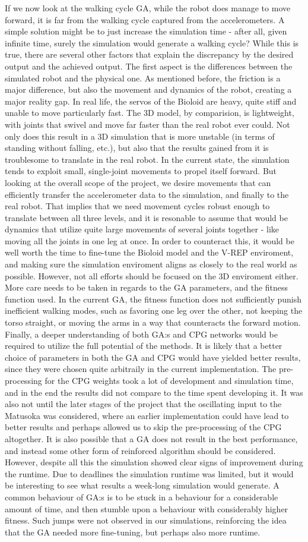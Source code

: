 If we now look at the walking cycle GA, while the robot does manage to move forward, it is far from the walking cycle captured from the accelerometers. A simple solution might be to just increase the simulation time - after all, given infinite time, surely the simulation would generate a walking cycle? While this is true, there are several other factors that explain the discrepancy by the desired output and the achieved output. The first aspect is the differences between the simulated robot and the physical one. As mentioned before, the friction is a major difference, but also the movement and dynamics of the robot, creating a major reality gap. In real life, the servos of the Bioloid are heavy, quite stiff and unable to move particularly fast. The 3D model, by comparision, is lightweight, with joints that swivel and move far faster than the real robot ever could. Not only does this result in a 3D simulation that is more unstable  (in terms of standing without falling, etc.), but also that the results gained from it is troublesome to translate in the real robot. In the current state, the simulation tends to exploit small, single-joint movements to propel itself forward. But looking at the overall scope of the project, we desire movements that can efficiently transfer the accelerometer data to the simulation, and finally to the real robot. That implies that we need movement cycles robust enough to translate between all three levels, and it is resonable to assume that would be dynamics that utilize quite large movements of several joints together - like moving all the joints in one leg at once. In order to counteract this, it would be well worth the time to fine-tune the Bioloid model and the V-REP enviroment, and making sure the simulation enviroment aligns as closely to the real world as possible. However, not all efforts should be focused on the 3D enviroment either. More care needs to be taken in regards to the GA parameters, and the fitness function used. In the current GA, the fitness function does not sufficiently punish inefficient walking modes, such as favoring one leg over the other, not keeping the torso straight, or moving the arms in a way that counteracts the forward motion. Finally, a deeper  understanding of both GA:s and CPG networks would be required to utilize the full potential of the methods. It is likely that a better choice of parameters in both the GA and CPG would have yielded better results, since they were chosen quite arbitraily in the current implementation. The pre-processing for the CPG weights took a lot of development and simulation time, and in the end the results did not compare to the time spent developing it. It was also not until the later stages of the project that the oscillating input to the Matusoka was considered, where an earlier implementation could have lead to better results and perhaps allowed us to skip the pre-processing of the CPG altogether. It is also possible that a GA does not result in the best performance, and instead some other form of reinforced algorithm should be considered. However, despite all this the simulation showed clear signs of improvement during the runtime. Due to deadlines the simulation runtime was limited, but it would be interesting to see what results a week-long simulation would generate. A common behaviour of GA:s is to be stuck in a behaviour for a considerable amount of time, and then stumble upon a behaviour with considerably higher fitness. Such jumps were not observed in our simulations, reinforcing the idea that the GA needed more fine-tuning, but perhaps also more runtime.